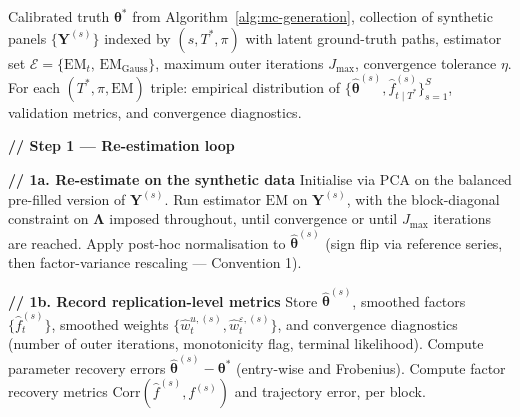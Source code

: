 \documentclass[11pt, a4paper, oneside]{article}
\newcommand{\mY}{\mathbf{Y}}
\begin{document}
\begin{algorithm}[H]
\caption{Monte Carlo design — re-estimation and aggregation}
\label{alg:mc-estimation}
\footnotesize
\begin{algorithmic}[1]
\Require Calibrated truth $\boldsymbol{\theta}^*$ from
         Algorithm~\ref{alg:mc-generation},
         collection of synthetic panels $\{\mY^{(s)}\}$ indexed by
         $(s, T^*, \pi)$ with latent ground-truth paths,
         estimator set $\mathcal{E} = \{\mathrm{EM}_t,\, \mathrm{EM}_{\mathrm{Gauss}}\}$,
         maximum outer iterations $J_{\max}$,
         convergence tolerance $\eta$.
\Ensure For each $(T^*, \pi, \mathrm{EM})$ triple: empirical
        distribution of
        $\{\hat{\boldsymbol{\theta}}^{(s)}, \hat{f}^{(s)}_{t \mid T^*}\}_{s=1}^{S}$,
        validation metrics, and convergence diagnostics.

\vspace{0.3em}
\State \textbf{// Step 1 — Re-estimation loop}
    \For{$\pi \in \Pi$}
                
                \vspace{0.2em}
                \State \textbf{// 1a. Re-estimate on the synthetic data}
                \State Initialise via PCA on the balanced
                       pre-filled version of $\mY^{(s)}$.
                \State Run estimator $\mathrm{EM}$ on $\mY^{(s)}$,
                       with the block-diagonal constraint on
                       $\boldsymbol{\Lambda}$ imposed throughout,
                       until convergence or until $J_{\max}$
                       iterations are reached.
                \State Apply post-hoc normalisation to
                       $\hat{\boldsymbol{\theta}}^{(s)}$
                       (sign flip via reference series, then
                       factor-variance rescaling — Convention 1).
                
                \vspace{0.2em}
                \State \textbf{// 1b. Record replication-level metrics}
                \State Store
                       $\hat{\boldsymbol{\theta}}^{(s)}$,
                       smoothed factors
                       $\{\hat{f}_t^{(s)}\}$,
                       smoothed weights
                       $\{\hat{w}^{u, (s)}_t, \hat{w}^{\varepsilon, (s)}_t\}$,
                       and convergence diagnostics (number of outer
                       iterations, monotonicity flag, terminal
                       likelihood).
                \State Compute parameter recovery errors
                       $\hat{\boldsymbol{\theta}}^{(s)} - \boldsymbol{\theta}^*$
                       (entry-wise and Frobenius).
                \State Compute factor recovery metrics
                       $\mathrm{Corr}(\hat{f}^{(s)}, f^{(s)})$
                       and trajectory error, per block.
            \EndFor
        \EndFor
    \EndFor
\EndFor


\end{algorithmic}
\end{algorithm}
\end{document}
